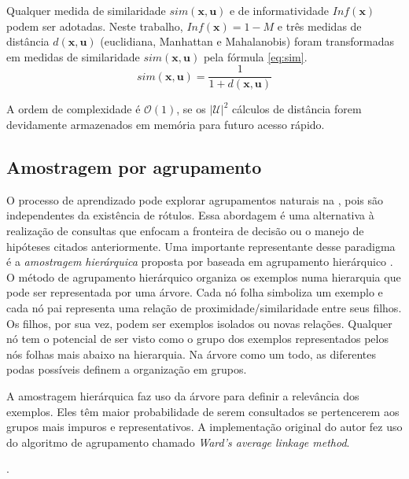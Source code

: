 Qualquer medida de similaridade $sim(\bm{x},\bm{u})$
e de informatividade $Inf(\bm{x})$ podem ser adotadas.
Neste trabalho, $Inf(\bm{x}) = 1 - M$ e três medidas de distância $d(\bm{x},\bm{u})$
(euclidiana, Manhattan e Mahalanobis) foram transformadas em medidas de similaridade
$sim(\bm{x},\bm{u})$ pela fórmula \ref{eq:sim}.
\begin{equation}\label{eq:sim}
 sim(\bm{x},\bm{u}) = \frac{1}{1 + d(\bm{x},\bm{u})}
\end{equation}

A ordem de complexidade é $\mathcal{O}(1)$, se os $|\mathcal{U}|^2$ cálculos de distância forem
devidamente armazenados em memória para futuro acesso rápido.


\subsection{Amostragem por agrupamento}
O processo de aprendizado pode explorar agrupamentos naturais na \pool,
pois são independentes da existência de rótulos.
Essa abordagem é uma alternativa à realização de consultas que enfocam a fronteira de decisão ou
o manejo de hipóteses citados anteriormente.
Uma importante representante desse paradigma é a \textit{amostragem hierárquica}
proposta por \cite{journals/tcs/Dasgupta11} baseada em
agrupamento hierárquico \citep{journals/cj/Murtagh83}.
O método de agrupamento hierárquico organiza os exemplos numa hierarquia que pode
ser representada por uma árvore.
Cada nó folha simboliza um exemplo e cada nó pai representa uma relação de
proximidade/similaridade entre seus filhos.
Os filhos, por sua vez, podem ser exemplos isolados ou novas relações.
Qualquer nó tem o potencial de ser visto como o grupo dos exemplos representados
pelos nós folhas mais abaixo na hierarquia.
Na árvore como um todo, as diferentes podas possíveis definem a organização em grupos.

A amostragem hierárquica faz uso da árvore para definir a relevância dos exemplos.
Eles têm maior probabilidade de serem consultados se pertencerem aos grupos
mais impuros e representativos.
A implementação original do autor fez uso do algoritmo de agrupamento chamado
\textit{Ward's average linkage method}.

.



